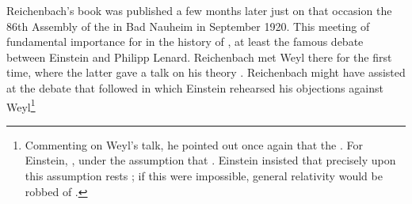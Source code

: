 \documentclass[draft]{article}
\begin{document}
Reichenbach's book was published a few months later just on that occasion the 86th Assembly of the  in Bad Nauheim in September 1920. This meeting of fundamental importance for in the history of \rt, at least  the famous debate between Einstein and Philipp Lenard. Reichenbach met Weyl there for the first time, where the latter gave a talk on his theory \citep{Weyl1920}. Reichenbach might have assisted at the debate that followed in which Einstein rehearsed his objections against Weyl\footnote{Commenting on Weyl's talk, he pointed out once again that the   \citep[650]{Einstein1920c}. For Einstein, , under the assumption that  \citep[650]{Einstein1920c}. Einstein insisted that precisely upon this assumption rests ; if this were impossible, general relativity would be robbed of  \citep[650]{Einstein1920c}.
}
\end{document}

